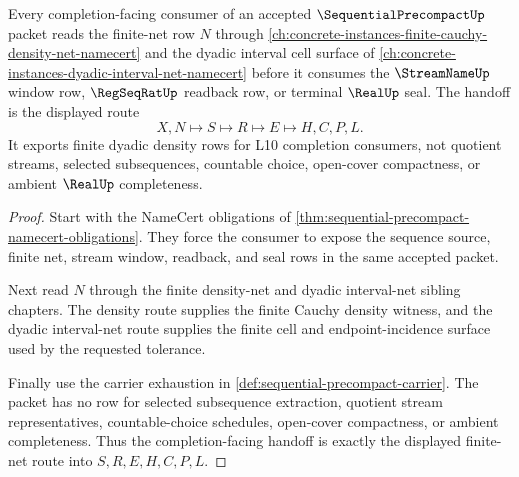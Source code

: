 \begin{theorem}
\label{thm:sequential-precompact-finite-net-handoff}
Every completion-facing consumer of an accepted $\SequentialPrecompactUp$ packet reads the finite-net row $N$ through \autoref{ch:concrete-instances-finite-cauchy-density-net-namecert} and the dyadic interval cell surface of \autoref{ch:concrete-instances-dyadic-interval-net-namecert} before it consumes the $\StreamNameUp$ window row, $\RegSeqRatUp$ readback row, or terminal $\RealUp$ seal. The handoff is the displayed route
$$
X,N \longmapsto S \longmapsto R \longmapsto E \longmapsto H,C,P,L .
$$
It exports finite dyadic density rows for L10 completion consumers, not quotient streams, selected subsequences, countable choice, open-cover compactness, or ambient $\RealUp$ completeness.
\end{theorem}
\begin{proof}
Start with the NameCert obligations of \autoref{thm:sequential-precompact-namecert-obligations}. They force the consumer to expose the sequence source, finite net, stream window, readback, and seal rows in the same accepted packet.

Next read $N$ through the finite density-net and dyadic interval-net sibling chapters. The density route supplies the finite Cauchy density witness, and the dyadic interval-net route supplies the finite cell and endpoint-incidence surface used by the requested tolerance.

Finally use the carrier exhaustion in \autoref{def:sequential-precompact-carrier}. The packet has no row for selected subsequence extraction, quotient stream representatives, countable-choice schedules, open-cover compactness, or ambient completeness. Thus the completion-facing handoff is exactly the displayed finite-net route into $S,R,E,H,C,P,L$.
\end{proof}


